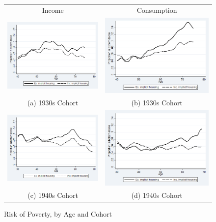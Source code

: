 \begin{figure}
\caption{Risk of Poverty, by Age and Cohort }
\centering
\begin{tabular}{c c}
Income & Consumption\\
\includegraphics[width=.5\linewidth]{pictures/cohort2_agerisksmooth_inc.png} &
\includegraphics[width=.5\linewidth]{pictures/cohort2_agerisksmooth_con.png} \\
(a) 1930s Cohort & (b) 1930s Cohort \\
\includegraphics[width=.5\linewidth]{pictures/cohort3_agerisksmooth_inc.png} &
\includegraphics[width=.5\linewidth]{pictures/cohort3_agerisksmooth_con.png} \\
(c) 1940s Cohort & (d) 1940s Cohort \\
\end{tabular}
\label{fig:povage_cohort_restrict}
\end{figure}


